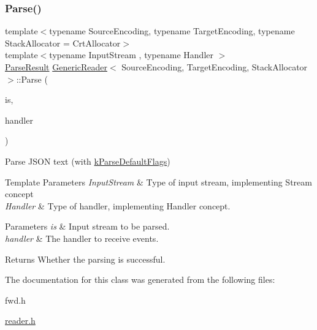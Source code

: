 \subsubsection{\texorpdfstring{Parse()}{Parse()}\hspace{0.1cm}{\footnotesize\ttfamily [2/2]}}
{\footnotesize\ttfamily template$<$typename Source\+Encoding, typename Target\+Encoding, typename Stack\+Allocator = Crt\+Allocator$>$ \\
template$<$typename Input\+Stream , typename Handler $>$ \\
\hyperlink{a02188}{Parse\+Result} \hyperlink{a02220}{Generic\+Reader}$<$ Source\+Encoding, Target\+Encoding, Stack\+Allocator $>$\+::Parse (\begin{DoxyParamCaption}\item[{Input\+Stream \&}]{is,  }\item[{Handler \&}]{handler }\end{DoxyParamCaption})\hspace{0.3cm}{\ttfamily [inline]}}



Parse J\+S\+ON text (with \hyperlink{a00563_ab7be7dabe6ffcba60fad441505583450a9104b0946d648e9467cb7a967401ec80}{k\+Parse\+Default\+Flags}) 


\begin{DoxyTemplParams}{Template Parameters}
{\em Input\+Stream} & Type of input stream, implementing Stream concept \\
\hline
{\em Handler} & Type of handler, implementing Handler concept. \\
\hline
\end{DoxyTemplParams}

\begin{DoxyParams}{Parameters}
{\em is} & Input stream to be parsed. \\
\hline
{\em handler} & The handler to receive events. \\
\hline
\end{DoxyParams}
\begin{DoxyReturn}{Returns}
Whether the parsing is successful. 
\end{DoxyReturn}


The documentation for this class was generated from the following files\+:\begin{DoxyCompactItemize}
\item 
fwd.\+h\item 
\hyperlink{a00563}{reader.\+h}\end{DoxyCompactItemize}
